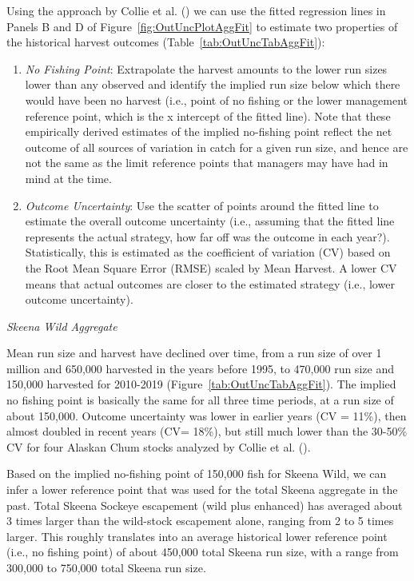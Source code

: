 \documentclass[french,11pt]{book}
\begin{document}
Using the approach by Collie et al. () we can use the fitted regression lines in Panels B and D of Figure~\ref{fig:OutUncPlotAggFit} to estimate two properties of the historical harvest outcomes (Table~\ref{tab:OutUncTabAggFit}):
\begin{enumerate}
\def\labelenumi{\arabic{enumi}.}

\item
  \emph{No Fishing Point}: Extrapolate the harvest amounts to the lower run sizes lower than any observed and identify the implied run size below which there would have been no harvest (i.e., point of no fishing or the lower management reference point, which is the x intercept of the fitted line). Note that these empirically derived estimates of the implied no-fishing point reflect the net outcome of all sources of variation in catch for a given run size, and hence are not the same as the limit reference points that managers may have had in mind at the time.
\item
  \emph{Outcome Uncertainty}: Use the scatter of points around the fitted line to estimate the overall outcome uncertainty (i.e., assuming that the fitted line represents the actual strategy, how far off was the outcome in each year?). Statistically, this is estimated as the coefficient of variation (CV) based on the Root Mean Square Error (RMSE) scaled by Mean Harvest. A lower CV means that actual outcomes are closer to the estimated strategy (i.e., lower outcome uncertainty).
\end{enumerate}
\emph{Skeena Wild Aggregate}

Mean run size and harvest have declined over time, from a run size of over 1 million and 650,000 harvested in the years before 1995, to 470,000 run size and 150,000 harvested for 2010-2019 (Figure~\ref{tab:OutUncTabAggFit}). The implied no fishing point is basically the same for all three time periods, at a run size of about 150,000. Outcome uncertainty was lower in earlier years (CV = 11\%), then almost doubled in recent years (CV= 18\%), but still much lower than the 30-50\% CV for four Alaskan Chum stocks analyzed by Collie et al. ().

Based on the implied no-fishing point of 150,000 fish for Skeena Wild, we can infer a lower reference point that was used for the total Skeena aggregate in the past. Total Skeena Sockeye escapement (wild plus enhanced) has averaged about 3 times larger than the wild-stock escapement alone, ranging from 2 to 5 times larger. This roughly translates into an average historical lower reference point (i.e., no fishing point) of about 450,000 total Skeena run size, with a range from 300,000 to 750,000 total Skeena run size.
\end{document}
